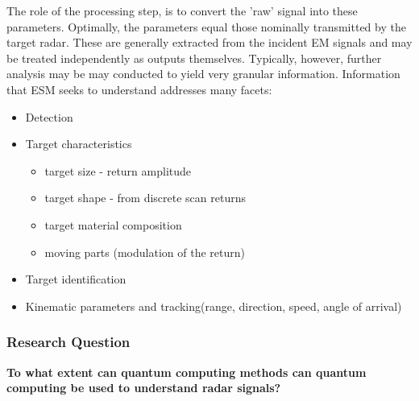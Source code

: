 The role of the processing step, is to convert the 'raw' signal into these parameters. Optimally, the parameters equal those nominally transmitted by the target radar.
These are generally extracted from the incident EM signals and may be treated independently as outputs themselves. Typically, however, further analysis may be may conducted to yield very granular information. Information that ESM seeks to understand addresses many facets:
\begin{itemize}
    \item Detection
    \item Target characteristics \cite{jenn_radar_2007}
    \begin{itemize}
        \item target size - return amplitude
        \item target shape - from discrete scan returns
        \item target material composition
        \item moving parts (modulation of the return)
    \end{itemize}
    \item Target identification
    \item Kinematic parameters and tracking(range, direction, speed, angle of arrival)
\end{itemize}


\subsubsection{Research Question}
\textbf{To what extent can quantum computing methods can quantum computing be used to understand radar
signals?}

